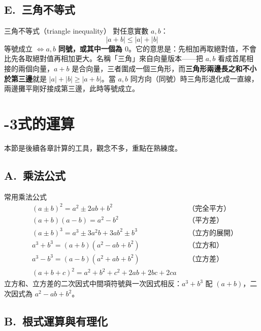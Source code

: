 \documentclass[11pt]{article}
\begin{document}
\subsection*{\sffamily E.\ 三角不等式}

\begin{補充框}{三角不等式（triangle inequality）}
對任意實數 $a,b$：
$$\boxed{\;|a+b|\le|a|+|b|\;}$$
等號成立 $\iff a,b$ \textbf{同號，或其中一個為 $0$}。它的意思是：先相加再取絕對值，不會比先各取絕對值再相加更大。名稱「三角」來自向量版本——把 $a,b$ 看成首尾相接的兩個向量，$a+b$ 是合向量，三者圍成一個三角形，而\textbf{三角形兩邊長之和不小於第三邊}就是 $|a|+|b|\ge|a+b|$。當 $a,b$ 同方向（同號）時三角形退化成一直線，兩邊攤平剛好接成第三邊，此時等號成立。
\end{補充框}


\section*{-3\quad 式的運算}

本節是後續各章計算的工具，觀念不多，重點在熟練度。

\subsection*{\sffamily A.\ 乘法公式}

\begin{補充框}{常用乘法公式}
$$
\begin{aligned}
&(a\pm b)^2=a^2\pm2ab+b^2 &&\text{（完全平方）}\\
&(a+b)(a-b)=a^2-b^2 &&\text{（平方差）}\\
&(a\pm b)^3=a^3\pm3a^2b+3ab^2\pm b^3 &&\text{（立方的展開）}\\
&a^3+b^3=(a+b)(a^2-ab+b^2) &&\text{（立方和）}\\
&a^3-b^3=(a-b)(a^2+ab+b^2) &&\text{（立方差）}\\
&(a+b+c)^2=a^2+b^2+c^2+2ab+2bc+2ca &&
\end{aligned}
$$
立方和、立方差的二次因式中間項符號與一次因式相反：$a^3+b^3$ 配 $(a+b)$，二次因式為 $a^2-ab+b^2$。
\end{補充框}

\subsection*{\sffamily B.\ 根式運算與有理化}
\end{document}
